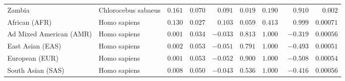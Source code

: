 \begin{center}
\begin{adjustbox}{width = 1\textwidth}
\begin{tabular}{|l|l|r|r|r|r|r|r|r|}
            Zambia        & Chlorocebus sabaeus        & $ 0.161$ & $ 0.070$  & $ 0.091$ & $ 0.019$ & $ 0.190~~$ & $ 0.910$ & $ 0.002$ \\
            African (AFR)               & Homo sapiens        & $ 0.130$ & $ 0.027$  & $ 0.103$ & $ 0.059$ & $ 0.413~~$     & $ 0.999$ & $0.00071$ \\
            Ad Mixed American (AMR)                 & Homo sapiens        & $ 0.001$ & $ 0.034$  & $-0.033$ & $ 0.813$ & $ 1.000~~$     & $-0.319$ & $0.00056$ \\
            East Asian (EAS)              & Homo sapiens        & $ 0.002$ & $ 0.053$  & $-0.051$ & $ 0.791$ & $ 1.000~~$     & $-0.493$ & $0.00051$ \\
            European (EUR)              & Homo sapiens        & $ 0.001$ & $ 0.053$  & $-0.052$ & $ 0.900$ & $ 1.000~~$     & $-0.508$ & $0.00054$ \\
            South Asian (SAS)              & Homo sapiens        & $ 0.008$ & $ 0.050$  & $-0.043$ & $ 0.536$ & $ 1.000~~$     & $-0.416$ & $0.00056$ \\
            \bottomrule
        \end{tabular}
    \end{adjustbox}
    \newpage
\end{center}

